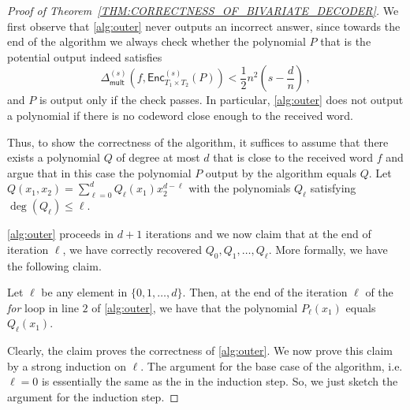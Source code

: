 \documentclass{article}
\def\Field{\mathbb{F}}
\let\F\Field
\newcommand{\enc}{{\mathsf{Enc}}}
\newcommand{\Delm}{\Delta_{\mathsf{mult}}}
\begin{document}
	\begin{proof}[Proof of Theorem~\ref{THM:CORRECTNESS_OF_BIVARIATE_DECODER}]
		\label{proof:bivariate_decoder}
		We first observe that \cref{alg:outer} never outputs an incorrect answer, since towards the end of the algorithm we always check whether the polynomial $P$ that is the potential output indeed 
		satisfies \[
		\Delm^{(s)}(f,\enc^{(s)}_{T_1 \times T_2}(P)) < \frac{1}{2} n^2 \left(s-\frac{d}{n}\right) \, ,
		\]
		and $P$ is output only if the check passes. In particular, \cref{alg:outer} does not output a polynomial if there is no codeword close enough to the received word. 
		
		Thus, to show the correctness of the algorithm, it suffices to assume that there exists a polynomial $Q$ of degree at most $d$ that is close to the received word $f$ and argue that in this case the polynomial $P$  output by the algorithm equals $Q$. Let $Q(x_1,x_2) = \sum_{\ell = 0}^d Q_{\ell}(x_1)x_2^{d-\ell}$ with the polynomials $Q_{\ell}$ satisfying $\deg(Q_{\ell}) \leq \ell$.  
		
		\cref{alg:outer} proceeds in $d+1$ iterations and we now claim that at the end of iteration $\ell$,  we have correctly recovered $Q_{0}, Q_1, \ldots, Q_{\ell}$.  More formally, we have the following claim. 
		
		\begin{claim}\label{claim: correctness of bivariate algorithm induction}
			Let $\ell$ be any element in $\{0, 1, \ldots, d\}$. Then, at the end of the iteration $\ell$ of the \emph{for} loop in line $2$ of \cref{alg:outer}, we have that the polynomial $P_{\ell}(x_1)$ equals $Q_{\ell}(x_1)$. 
		\end{claim}
		Clearly, the claim proves the correctness of \cref{alg:outer}. We now prove this claim by a strong induction on $\ell$. The argument for the base case of the algorithm, i.e. $\ell = 0$ is essentially the same as the in the induction step. So, we just sketch the argument for the induction step. 
		

\end{proof}
\end{document}
